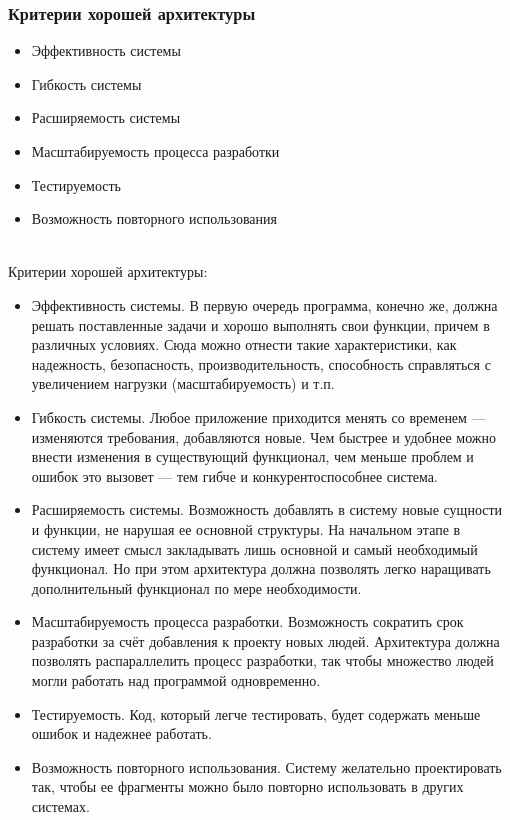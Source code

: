 \documentclass{../industrial-development}
\begin{document}
\begin{frame} \frametitle{Критерии хорошей архитектуры}
\begin{itemize}
	\item Эффективность системы
	\item Гибкость системы
	\item Расширяемость системы
	\item Масштабируемость процесса разработки
	\item Тестируемость
	\item Возможность повторного использования
\end{itemize}

\end{frame}
\lecturenotes
\\Критерии хорошей архитектуры:
\begin{itemize}
	\item Эффективность системы. В первую очередь программа, конечно же, должна решать поставленные задачи и хорошо выполнять свои функции, причем в различных условиях. Сюда можно отнести такие характеристики, как надежность, безопасность, производительность, способность справляться с увеличением нагрузки (масштабируемость) и т.п.
	\item Гибкость системы. Любое приложение приходится менять со временем — изменяются требования, добавляются новые. Чем быстрее и удобнее можно внести изменения в существующий функционал, чем меньше проблем и ошибок это вызовет — тем гибче и конкурентоспособнее система. 
	\item Расширяемость системы. Возможность добавлять в систему новые сущности и функции, не нарушая ее основной структуры. На начальном этапе в систему имеет смысл закладывать лишь основной и самый необходимый функционал. Но при этом архитектура должна позволять легко наращивать дополнительный функционал по мере необходимости.
	\item Масштабируемость процесса разработки. Возможность сократить срок разработки за счёт добавления к проекту новых людей. Архитектура должна позволять распараллелить процесс разработки, так чтобы множество людей могли работать над программой одновременно.
	\item Тестируемость. Код, который легче тестировать, будет содержать меньше ошибок и надежнее работать.
	\item Возможность повторного использования. Систему желательно проектировать так, чтобы ее фрагменты можно было повторно использовать в других системах.
\end{itemize}
\end{document}
